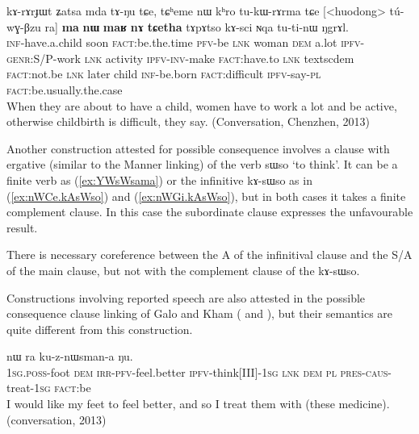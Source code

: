 \documentclass[oldfontcommands,oneside,a4paper,11pt]{article}
\newcommand{\ipa}[1]{{\phon \mbox{#1}}} %
\newcommand{\refb}[1]{(\ref{#1})}
\begin{document}
  \begin{exe}
\ex \label{ex:Zatsa.mda}
\gll 
 \ipa{kɤ-rɤrɟɯt}  	\ipa{ʑatsa}  	\ipa{mda}  	\ipa{tɤ-ŋu}  	\ipa{tɕe,}  	\ipa{tɕʰeme}  	\ipa{nɯ}  	\ipa{kʰro}  	\ipa{tu-kɯ-rɤrma}  	\ipa{tɕe}  	[<huodong>  	\ipa{tú-wɣ-βzu}  	\ipa{ra}]  	\ipa{\textbf{ma}}  	\ipa{\textbf{nɯ}}  	\ipa{\textbf{maʁ}}  	\ipa{\textbf{nɤ}}  	\ipa{\textbf{tɕetha}}  	\ipa{tɤpɤtso}  	\ipa{kɤ-sci}  	\ipa{ɴqa}  	\ipa{tu-ti-nɯ}  	\ipa{ŋgrɤl.} \\
 \textsc{inf}-have.a.child soon \textsc{fact}:be.the.time  \textsc{pfv}-be \textsc{lnk} woman \textsc{dem} a.lot \textsc{ipfv-genr}:S/P-work \textsc{lnk} activity \textsc{ipfv-inv}-make \textsc{fact:}have.to \textsc{lnk} textsc{dem} \textsc{fact}:not.be \textsc{lnk}  later
 child \textsc{inf}-be.born  \textsc{fact}:difficult \textsc{ipfv}-say-\textsc{pl} \textsc{fact}:be.usually.the.case  \\
 \glt When they are about to have a child, women have to work a lot and be active, otherwise   childbirth is difficult, they say. (Conversation, Chenzhen, 2013)
 \end{exe}
 
 Another construction attested for possible consequence involves a clause with ergative (similar to the Manner linking) of the verb \ipa{sɯso} `to think'. It can be a finite verb as \refb{ex:YWsWsama} or the infinitive \ipa{kɤ-sɯso} as in \refb{ex:nWCe.kAsWso} and \refb{ex:nWGi.kAsWso}, but in both cases it  takes a finite complement clause.  In this case the subordinate clause expresses the unfavourable result.
 
 There is necessary coreference between the A of the infinitival clause and the S/A of the main clause, but not with the complement clause of the  \ipa{kɤ-sɯso}. 
 
 Constructions involving reported speech are also attested in the possible consequence clause linking   of Galo and Kham  (\citealt[86, 88]{post09linking} and \citealt[110]{watters09kham}), but their semantics are quite different from this construction.
 
   \begin{exe}
\ex \label{ex:YWsWsama}
\gll 
[\ipa{a-mi}  	\ipa{nɯnɯ}  	\ipa{a-tɤ-mna}  	\ipa{ɲɯ-sɯsam-a}]  	\ipa{tɕe,}  	\ipa{nɯ} \ipa{ra}  	\ipa{ku-z-nɯsman-a}  	\ipa{ŋu.}   \\
\textsc{1sg.poss}-foot \textsc{dem} \textsc{irr-pfv}-feel.better  \textsc{ipfv}-think[III]-\textsc{1sg} \textsc{lnk} \textsc{dem} \textsc{pl} \textsc{pres-caus}-treat-\textsc{1sg}  \textsc{fact}:be \\
\glt I would like my feet to feel better, and so I treat them with (these medicine). (conversation, 2013)
  \end{exe}
 
\end{document}

